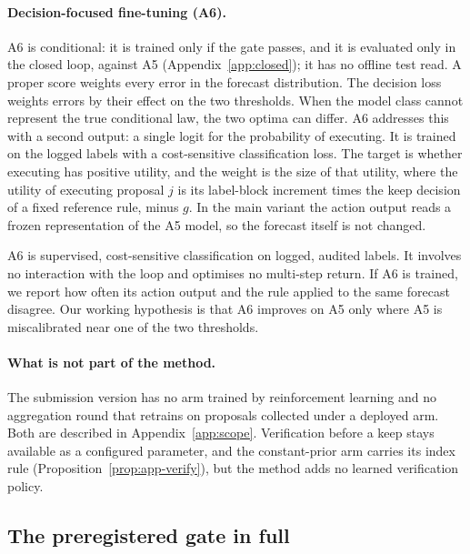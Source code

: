 \paragraph{Decision-focused fine-tuning (A6).}
A6 is conditional: it is trained only if the gate passes, and it is evaluated only in the closed loop, against A5 (Appendix~\ref{app:closed}); it has no offline test read. A proper score weights every error in the forecast distribution. The decision loss weights errors by their effect on the two thresholds. When the model class cannot represent the true conditional law, the two optima can differ. A6 addresses this with a second output: a single logit for the probability of executing. It is trained on the logged labels with a cost-sensitive classification loss. The target is whether executing has positive utility, and the weight is the size of that utility, where the utility of executing proposal $j$ is its label-block increment times the keep decision of a fixed reference rule, minus $g$. In the main variant the action output reads a frozen representation of the A5 model, so the forecast itself is not changed.

A6 is supervised, cost-sensitive classification on logged, audited labels. It involves no interaction with the loop and optimises no multi-step return. If A6 is trained, we report how often its action output and the rule applied to the same forecast disagree. Our working hypothesis is that A6 improves on A5 only where A5 is miscalibrated near one of the two thresholds. 

\paragraph{What is not part of the method.}

The submission version has no arm trained by reinforcement learning and no aggregation round that retrains on proposals collected under a deployed arm. Both are described in Appendix~\ref{app:scope}. Verification before a keep stays available as a configured parameter, and the constant-prior arm carries its index rule (Proposition~\ref{prop:app-verify}), but the method adds no learned verification policy.

\subsection{The preregistered gate in full}
\label{app:gate}

